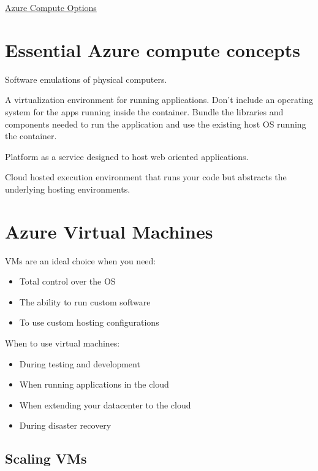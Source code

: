 \documentclass{article}[18pt]
\begin{document}
\begin{center}
\underline{\huge Azure Compute Options}
\end{center}
\section{Essential Azure compute concepts}
\begin{definition}
	Software emulations of physical computers.
\end{definition}
\begin{definition}[Containers]
	A virtualization environment for running applications. Don't include an operating system for the apps running inside the container. Bundle the libraries and components needed to run the application and use the existing host OS running the container.
\end{definition}

\begin{definition}
	Platform as a service designed to host web oriented applications.
\end{definition}

\begin{definition}
	Cloud hosted execution environment that runs your code but abstracts the underlying hosting environments.
\end{definition}
\section{Azure Virtual Machines}
VMs are an ideal choice when you need:
\begin{itemize}
	\item Total control over the OS
	\item The ability to run custom software
	\item To use custom hosting configurations
\end{itemize}
When to use virtual machines:
\begin{itemize}
	\item During testing and development
	\item When running applications in the cloud
	\item When extending your datacenter to the cloud
	\item During disaster recovery
\end{itemize}
\subsection{Scaling VMs}
\end{document}
